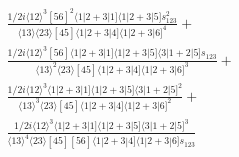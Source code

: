 \documentclass[varwidth, border=5pt]{standalone}
\begin{document}
\begin{my}
$\begin{gathered}
\scriptscriptstyle\frac{1/2i⟨12⟩^3[56]^2⟨1|2+3|1]⟨1|2+3|5]s_{123}^2}{⟨13⟩⟨23⟩[45]⟨1|2+3|4]⟨1|2+3|6]^4}+\\
\scriptscriptstyle\frac{1/2i⟨12⟩^3[56]⟨1|2+3|1]⟨1|2+3|5]⟨3|1+2|5]s_{123}}{⟨13⟩^2⟨23⟩[45]⟨1|2+3|4]⟨1|2+3|6]^3}+\\
\scriptscriptstyle\frac{1/2i⟨12⟩^3⟨1|2+3|1]⟨1|2+3|5]⟨3|1+2|5]^2}{⟨13⟩^3⟨23⟩[45]⟨1|2+3|4]⟨1|2+3|6]^2}+\\
\scriptscriptstyle\frac{1/2i⟨12⟩^3⟨1|2+3|1]⟨1|2+3|5]⟨3|1+2|5]^3}{⟨13⟩^4⟨23⟩[45][56]⟨1|2+3|4]⟨1|2+3|6]s_{123}}\phantom{+}
\end{gathered}$
\end{my}
\end{document}
